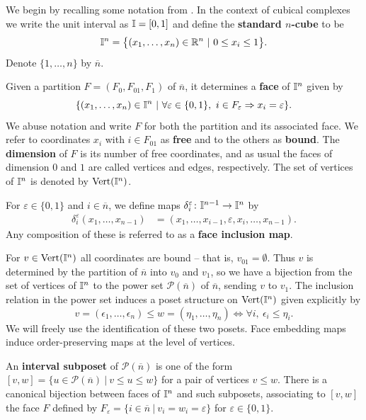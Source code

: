 We begin by recalling some notation from \cite{FMS-flows}. In the context of cubical complexes we write the unit interval as $\mathbb{I}=[0,1]$ and define the \textbf{standard $n$-cube} to be
\begin{equation*}
\mathbb{I}^n = \big\{ (x_1, \dots, x_n) \in \mathbb{R}^n\ |\ 0 \leq x_i \leq 1 \big\}.
\end{equation*}
Denote $\{1, \dots, n\}$ by $\overline{n}$.

Given a partition $F = (F_0, F_{01}, F_1)$ of $\overline n$, it determines a \textbf{face} of $\mathbb{I}^n$ given by
\begin{equation*}
\{(x_1, \dots, x_n) \in \mathbb{I}^n\ |\ \forall \varepsilon \in \{0, 1\},\ i \in F_\varepsilon \Rightarrow x_i = \varepsilon\}.
\end{equation*}
We abuse notation and write $F$ for both the partition and its associated face.  We refer to coordinates $x_i$ with $i \in F_{01}$ as \textbf{free} and to the others as \textbf{bound}.
The \textbf{dimension} of $F$ is its number of free coordinates, and as usual the faces of dimension $0$ and $1$ are called vertices and edges, respectively. The set of vertices of $\mathbb{I}^n$ is denoted by ${\rm Vert}(\mathbb{I}^n)$.

For $\varepsilon \in \{0, 1\}$ and $i \in \overline{n}$, we define maps $\delta_i^\varepsilon \colon \mathbb{I}^{n-1} \to \mathbb{I}^{n}$ by
\begin{align*}
\delta_i^\varepsilon(x_1, \dots, x_{n-1}) & = (x_1, \dots, x_{i-1}, \varepsilon, x_i, \dots, x_{n-1}).
\end{align*}
Any composition of these is referred to as a \textbf{face inclusion map}.

For $v \in {\rm Vert}(\mathbb{I}^n)$ all coordinates are bound -- that is, $v_{01} = \emptyset$. Thus
 $v$ is determined by the partition of $\overline n$ into $v_0$ and $v_1$, so
we have a bijection from the set of vertices of $\mathbb{I}^n$ to the power set $\mathcal P(\overline n)$ of $\overline n$, sending $v$ to $v_1$.
The inclusion relation in the power set induces a poset structure on ${\rm Vert}(\mathbb{I}^n)$ given explicitly by
\begin{equation*}
v = (\epsilon_1, \dots, \epsilon_n) \leq w = (\eta_1, \dots, \eta_n) \iff \forall i,\ \epsilon_i \leq \eta_i.
\end{equation*}
We will freely use the identification of these two posets.
Face embedding maps induce order-preserving maps at the level of vertices. 

An \textbf{interval subposet} of $\mathcal P(\overline n)$ is one of the form $[v, w] = \{u \in \mathcal P(\overline n)\ |\ v \leq u \leq w\}$ for a pair of vertices $v \leq w$. There is a canonical bijection between faces of $\mathbb{I}^n$ and such subposets, associating to $[v, w]$ the face $F$ defined by $F_\varepsilon = \{i \in \overline{n}\ |\ v_i = w_i = \varepsilon\}$ for $\varepsilon \in \{0, 1\}$.

